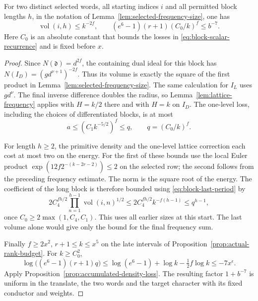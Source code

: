 \begin{auxlemma}
\label{lem:selected-density-error}
For two distinct selected words, all starting indices \(i\) and all
permitted block lengths \(h\), in the notation of
Lemma~\ref{lem:selected-frequency-size}, one has
\[
 \operatorname{vol}(i,h)\le k^{-2f},\qquad
 (e^6-1)(r+1)(C_0/k)^f\le b^{-7}.
\]
Here \(C_0\) is an absolute constant that bounds the losses in
\eqref{eq:block-scalar-recurrence} and is fixed before \(x\).
\end{auxlemma}
\begin{proof}
Since \(N(\mathfrak d)=d^{2f}\), the containing dual ideal for this
block has \(N(I_D)=(gd^{\nu+1})^{-2f}\). Thus its volume
is exactly the square of the first product in
Lemma~\ref{lem:selected-frequency-size}. The same calculation for
\(I_L\) uses \(gd^\nu\). The final inverse difference doubles the
radius, so Lemma~\ref{lem:lattice-frequency} applies with \(H=k/2\)
there and with \(H=k\) on \(I_D\). The one-level loss, including
the choices of differentiated blocks, is at most
\[
 a\le (C_1 k^{-5/2})^f\le q,\qquad q=(C_0/k)^f.
\]


For length \(h\ge2\), the primitive density and the one-level
lattice correction each cost at most two on the energy. For the
first of these bounds use the local Euler product
\(\exp(12f2^{-(k-2r-2)})\le2\) on the selected row; the second
follows from the preceding frequency estimate. The norm is the
square root of the energy. The coefficient of the long block is
therefore bounded using \eqref{eq:block-last-period} by
\[
 2 C_4^{fh/2}\prod_{n=1}^{h-1}\operatorname{vol}(i,n)^{1/2}
 \le 2 C_4^{fh/2}k^{-f(h-1)}\le q^{h-1},
\]
once \(C_0\ge2\max(1,C_4,C_1)\). This uses all earlier sizes
at this start. The last volume alone would give only the bound for
the final frequency sum.

Finally \(f\ge 2x^2\), \(r+1\le k\le x^5\) on the late intervals
of Proposition~\ref{prop:actual-rank-budget}. For \(k\ge C_0^2\),
\[
 \log\big((e^6-1)(r+1)q\big)
 \le \log(e^6-1)+\log k-\tfrac12 f\log k\le-7x^\epsilon .
\]
Apply Proposition~\ref{prop:accumulated-density-loss}. The resulting
factor \(1+b^{-7}\) is uniform in the translate, the two words
and the target character with its fixed conductor and weights.
\end{proof}

